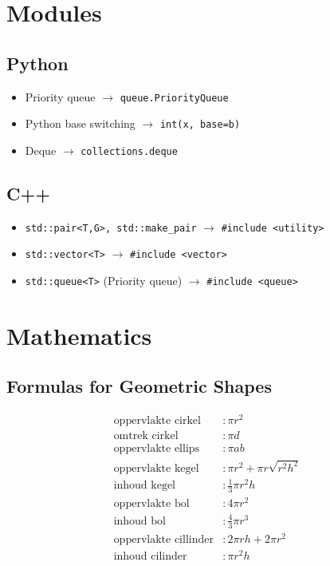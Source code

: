 \documentclass[a4paper, twocolumn]{article}
\newcommand{\arrow}{$\rightarrow$ }
\newcommand{\ms}{\texttt}
\begin{document}
\section{Modules}
\subsection{Python}
\begin{itemize}
	\item Priority queue \arrow \ms{queue.PriorityQueue}
	\item Python base switching \arrow \ms{int(x, base=b)}
	\item Deque \arrow \ms{collections.deque}
\end{itemize}
\subsection{C++}
\begin{itemize}
	\item \ms{std::pair<T,G>, std::make\_pair} \arrow \ms{\#include <utility>}
	\item \ms{std::vector<T>} \arrow \ms{\#include <vector>}
	\item \ms{std::queue<T>} (Priority queue) \arrow \ms{\#include <queue>}
\end{itemize}

\section{Mathematics}
\subsection*{Formulas for Geometric Shapes}
\vspace{-1em}
\begin{align*}
\text{oppervlakte cirkel}   &: \pi r^2 \\
\text{omtrek cirkel}        &: \pi d \\
\text{oppervlakte ellips}   &: \pi a b \\
\text{oppervlakte kegel}    &: \pi r^2 + \pi r \sqrt{r^2 h^2} \\
\text{inhoud kegel}         &: \frac{1}{3}\pi r^2 h \\
\text{oppervlakte bol}      &: 4 \pi r^2 \\
\text{inhoud bol}           &: \frac{4}{3} \pi r^3 \\
\text{oppervlakte cillinder}&: 2\pi rh + 2\pi r^2 \\
\text{inhoud cilinder}      &: \pi r^2 h\\
\end{align*}
\end{document}
